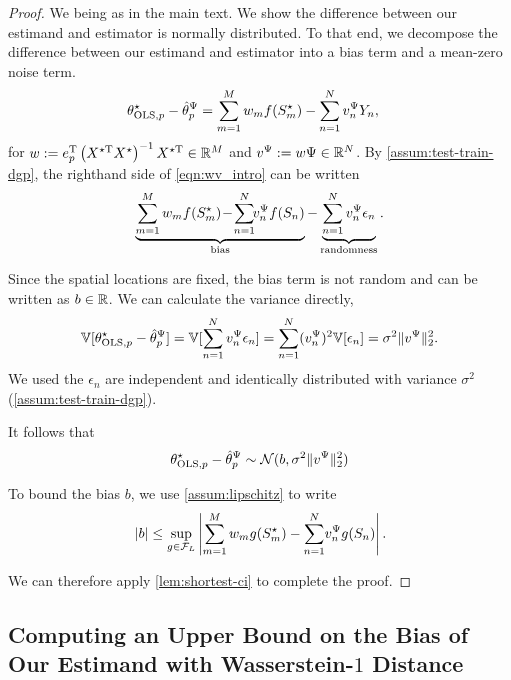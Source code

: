 \begin{proof}
    We being as in the main text. We show the difference between our estimand and estimator is normally distributed. To that end, we decompose the difference between our estimand and estimator into a bias term and a mean-zero noise term.
\begin{align}
    \label{eqn:wv_intro-app}
    \theta^{\star}_{\text{OLS},p} - \hat{\theta}_p^{\Psi}
    &=
    \sum_{m=1}^M w_m f(S^{\star}_m) - \sum_{n=1}^N v^{\Psi}_nY_n,
\end{align}
for $w:= e_p^{\mathrm{T}}\left(X^{\star\mathrm{T}}X^{\star} \right)^{-1}X^{\star\mathrm{T}} \in \mathbb{R}^{M}$ and $v^{\Psi} := w\Psi  \in \mathbb{R}^{N}$. By \cref{assum:test-train-dgp}, the righthand side of \cref{eqn:wv_intro} can be written 
\begin{align}\label{eqn:bias-variance-decomp-app}
\underbrace{\sum_{m=1}^M w_m f(S^{\star}_m) \!-\!\sum_{n=1}^N \!\!v^{\Psi}_n f(S_n)}_{\text{bias}} - \underbrace{\sum_{n=1}^N v^{\Psi}_n\epsilon_n}_{\text{randomness}}.
\end{align}

Since the spatial locations are fixed, the bias term is not random and can be written as $b \in \mathbb{R}$. We can calculate the variance directly,
\begin{align}
    \mathbb{V}[\theta^{\star}_{\text{OLS},p}  -  \hat{\theta}_p^{\Psi} ] = \mathbb{V}[\sum_{n=1}^N v^{\Psi}_n\epsilon_n] 
     =\sum_{n=1}^N (v^{\Psi}_n)^2 \mathbb{V}[\epsilon_n] 
     = \sigma^2 \|v^{\Psi}\|^2_2.
\end{align}
We used the $\epsilon_n$ are independent and identically distributed with variance $\sigma^2$ (\cref{assum:test-train-dgp}).

It follows that
\begin{align}\label{eqn:diff-gaussian-app}
    \theta^{\star}_{\text{OLS},p}  -  \hat{\theta}_p^{\Psi} \sim \mathcal{N}(b, \sigma^2\|v^{\Psi}\|_2^2)
\end{align}

To bound the bias $b$, we use \cref{assum:lipschitz} to write 
\begin{align}
    |b| \leq \sup_{g \in \mathcal{F}_L} \left|\sum_{m=1}^M w_m g(S^{\star}_m) -\sum_{n=1}^N \!v^{\Psi}_n g(S_n)\right|.\! \label{eqn:worst-case-bias-app}
\end{align}

We can therefore apply \cref{lem:shortest-ci} to complete the proof.
\end{proof}
\subsection{Computing an Upper Bound on the Bias of Our Estimand with Wasserstein-$1$ Distance}
\label{app:proof-weights}

